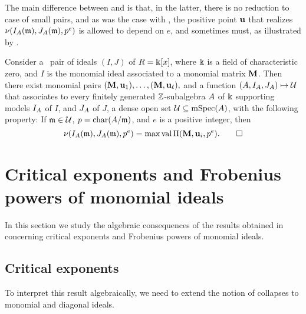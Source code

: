 \documentclass{article}
\begin{document}
The main difference between   and   is that, in the latter, there is no reduction to case of small pairs, and as was the case with  , the positive point $\mathbf{u}$ that realizes $\nu(I_A(\mathfrak{m}), J_A(\mathfrak{m}), p^e)$ is allowed to depend on $e$, and sometimes must, as illustrated by .

\begin{theorem}
   \label{nu invariants associated to a monomial ideal in large characteristic: T}   
   Consider a \compatible\ pair of ideals $(I,J)$ of $R=\Bbbk[x]$, where $\Bbbk$ is a field of characteristic zero, and $I$ is the monomial ideal associated to a monomial matrix $\mathbf{M}$.  Then there exist monomial pairs $(\mathbf{M}, \mathbf{u}_1),  \ldots, (\mathbf{M}, \mathbf{u}_{\ell}),$ and a function $(A, I_A, J_A) \mapsto \mathcal{U}$  that associates to every finitely generated $\mathbb{Z}$-subalgebra $A$ of $\Bbbk$ supporting models $I_A$ of $I$, and $J_A$ of $J$, a dense open set $\mathcal{U} \subseteq \operatorname{mSpec}(A)$, with the following property\textup:
   If $\mathfrak{m} \in \mathcal{U}$, $p = \operatorname{char}(A/\mathfrak{m})$, and $e$ is a positive integer, then 
   \[
      \nu(I_A(\mathfrak{m}), J_A(\mathfrak{m}), p^e) = \max \operatorname{val} \Pi (\mathbf{M}, \mathbf{u}_i, p^e).
      \qed
   \]
\end{theorem}

\section{Critical exponents and Frobenius powers of monomial ideals}
\label{frobenius-powers-monomial-ideals: S}

In this section we study the algebraic consequences of the results obtained in  concerning critical exponents and Frobenius powers of monomial ideals.

\subsection{Critical exponents}
\label{crits: SS}

To interpret this result algebraically, we need to extend the notion of collapses to monomial and diagonal ideals.
\end{document}

